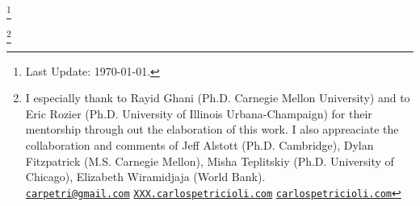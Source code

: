\thispagestyle{plain}
\begin{center}
\scshape \large \thetitle\footnote{ Last Update: \today.}
\bigskip

\scshape \theauthor\footnote{I especially thank to Rayid Ghani (Ph.D. Carnegie Mellon University) and to Eric Rozier (Ph.D. University of Illinois Urbana-Champaign) for their mentorship through out the elaboration of this work. I also appreaciate the collaboration and comments of Jeff Alstott (Ph.D. Cambridge), Dylan Fitzpatrick (M.S. Carnegie Mellon), Misha Teplitskiy (Ph.D. University of Chicago), Elizabeth Wiramidjaja (World Bank).
\\ \href{mailto:carpetri@gmail.com}{\texttt{carpetri@gmail.com}}  \hfill \href{http://XXX.carlospetricioli.com}{\texttt{XXX.carlospetricioli.com}} \hfill \href{http://carlospetricioli.com}{\texttt{carlospetricioli.com}} }
\normalsize
\end{center}

